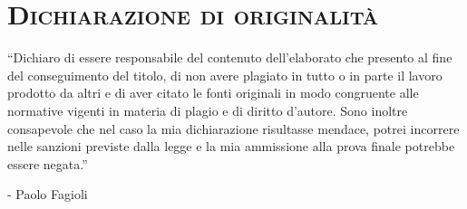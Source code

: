 \chapter*{\centering \textsc{Dichiarazione di originalità}}
\thispagestyle{empty}

``Dichiaro di essere responsabile del contenuto dell'elaborato che 
presento al fine del conseguimento del titolo, di non avere plagiato
in tutto o in parte il lavoro prodotto da altri e di aver citato le fonti
originali in modo congruente alle normative vigenti in materia di plagio e 
di diritto d'autore. Sono inoltre consapevole che nel caso la mia dichiarazione
risultasse mendace, potrei incorrere nelle sanzioni previste dalla legge e la 
mia ammissione alla prova finale potrebbe essere negata.''

\begin{flushright}
    - Paolo Fagioli
\end{flushright}